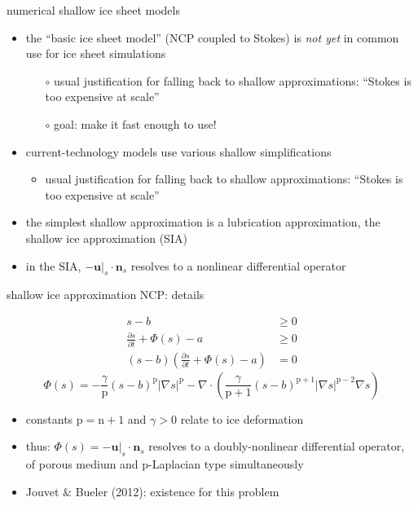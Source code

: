 \documentclass[svgnames,
               hyperref={colorlinks,citecolor=DeepPink4,linkcolor=FireBrick,urlcolor=Maroon},
               usepdftitle=false]  %
               {beamer}
\newcommand{\grad}{\nabla}
\newcommand{\bn}{\mathbf{n}}
\newcommand{\bu}{\mathbf{u}}
\newcommand{\nn}{{\text{n}}}
\newcommand{\pp}{{\text{p}}}
\begin{document}
\begin{frame}{numerical shallow ice sheet models}

\begin{itemize}
\item the ``basic ice sheet model'' (NCP coupled to Stokes) is \emph{not yet} in common use for ice sheet simulations
    \begin{itemize}
    \item[$\circ$] usual justification for falling back to shallow approximations: ``Stokes is too expensive at scale''
    \item[$\circ$] goal: \alert{make it fast enough to use!}
    \end{itemize}

\smallskip
\item<2-> current-technology models use various shallow simplifications
    \begin{itemize}
    \item<2->[$\circ$] usual justification for falling back to shallow approximations: ``Stokes is too expensive at scale''
    \end{itemize}
\item<2-> the simplest shallow approximation is a lubrication approximation, the \alert{shallow ice approximation} (SIA)
\item<2-> in the SIA, $- \bu|_s \cdot \bn_s$ resolves to a nonlinear differential operator  

\smallskip
\end{itemize}
\end{frame}


\begin{frame}{shallow ice approximation NCP: details}

{\small
\begin{align*}
s - b &\ge 0 \\
\frac{\partial s}{\partial t} + \Phi(s) - a &\ge 0 \\
(s - b) \left(\frac{\partial s}{\partial t} + \Phi(s) - a\right) &= 0
\end{align*}
\begin{equation*}
\Phi(s) = - \frac{\gamma}{\pp} (s-b)^{\pp} |\grad s|^{\pp} - \grad \cdot\left(\frac{\gamma}{\pp+1} (s-b)^{\pp+1} |\grad s|^{\pp-2} \grad s\right)
\end{equation*}
}

\begin{itemize}
\item constants $\pp = \nn+1$ and $\gamma > 0$ relate to ice deformation

\medskip
\item<2> thus: $\Phi(s) = - \bu|_s \cdot \bn_s$ resolves to a \alert{doubly-nonlinear} differential operator, of porous medium and $\pp$-Laplacian type simultaneously
\item<2> Jouvet \& Bueler (2012): existence for this problem
\end{itemize}
\end{frame}
\end{document}
